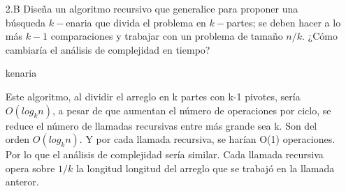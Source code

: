 \documentclass[12pt]{article}
\begin{document}
\begin{itemize}
    \item[2.B] Diseña un algoritmo recursivo que generalice para proponer una búsqueda $k-$enaria que divida el problema en $k-$partes; se deben hacer a lo más $k - 1$ comparaciones y trabajar con un problema de tamaño $n/k$. ¿Cómo cambiaría el análisis de complejidad en tiempo?\\
    \begin{algorithm}[H]
    \caption{kenaria}
    \SetAlgoLined
     \end{algorithm}
Este algoritmo, al dividir el arreglo en k partes con k-1 pivotes, sería $O(log_kn)$, a pesar de que aumentan el número de operaciones por ciclo, se reduce el número de llamadas recursivas entre más grande sea k. Son del orden $O(log_k{n})$. Y por cada llamada recursiva, se harían O(1) operaciones. Por lo que el análisis de complejidad sería similar. Cada llamada recursiva opera sobre $1/k$ la longitud longitud del arreglo que se trabajó en la llamada anteror.
\end{itemize}

\end{document}
